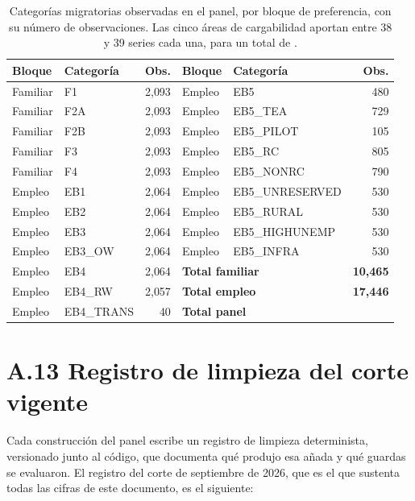 \documentclass[12pt,letterpaper]{report}
\begin{document}
\begin{table}[H]
\centering
\footnotesize
\caption[Catálogo de dimensiones observadas]{Categorías migratorias observadas en el panel,
por bloque de preferencia, con su número de observaciones. Las cinco áreas de cargabilidad
aportan entre 38 y 39 series cada una, para un total de \factNSeriesStructural{}.}
\label{tab:catalogo}
\begin{tabular}{p{2.2cm}p{3.0cm}r p{2.2cm}p{3.1cm}r}
\toprule
\rowcolor{uacjblue!15}
\textbf{Bloque} & \textbf{Categoría} & \textbf{Obs.} & \textbf{Bloque} & \textbf{Categoría} & \textbf{Obs.} \\ \midrule
Familiar & F1  & 2{,}093 & Empleo & EB5            & 480 \\
Familiar & F2A & 2{,}093 & Empleo & EB5\_TEA       & 729 \\
Familiar & F2B & 2{,}093 & Empleo & EB5\_PILOT     & 105 \\
Familiar & F3  & 2{,}093 & Empleo & EB5\_RC        & 805 \\
Familiar & F4  & 2{,}093 & Empleo & EB5\_NONRC     & 790 \\
Empleo & EB1        & 2{,}064 & Empleo & EB5\_UNRESERVED & 530 \\
Empleo & EB2        & 2{,}064 & Empleo & EB5\_RURAL      & 530 \\
Empleo & EB3        & 2{,}064 & Empleo & EB5\_HIGHUNEMP  & 530 \\
Empleo & EB3\_OW    & 2{,}064 & Empleo & EB5\_INFRA      & 530 \\
Empleo & EB4        & 2{,}064 & \multicolumn{2}{l}{\textbf{Total familiar}} & \textbf{10{,}465} \\
Empleo & EB4\_RW    & 2{,}057 & \multicolumn{2}{l}{\textbf{Total empleo}}   & \textbf{17{,}446} \\
Empleo & EB4\_TRANS & 40      & \multicolumn{2}{l}{\textbf{Total panel}}    & \textbf{\factNObsFmt{}} \\
\bottomrule
\end{tabular}
\end{table}

\section{A.13 Registro de limpieza del corte vigente}

Cada construcción del panel escribe un registro de limpieza determinista, versionado junto
al código, que documenta qué produjo esa añada y qué guardas se evaluaron. El registro del
corte de septiembre de 2026, que es el que sustenta todas las cifras de este documento, es el
siguiente:
\end{document}
